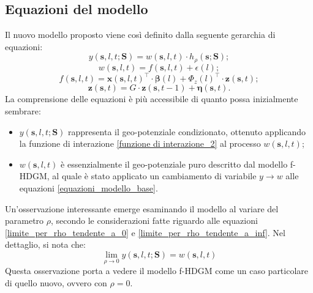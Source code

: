 \subsection[Equazioni del modello]{Equazioni del modello}
Il nuovo modello proposto viene così definito dalla seguente gerarchia di equazioni:
\begin{equation}
	y(\mathbf{s}, l, t; \mathbf{S}) = w(\mathbf{s}, l, t)\cdot h_\rho(\mathbf{s};\mathbf{S});
	\label{eq_rumore_uscita_HDGM}
\end{equation}
\begin{equation}
	w(\mathbf{s}, l, t)= f(\mathbf{s}, l, t) + \epsilon(l);
	\label{eq_rumore_uscita_fp_HDGM}
\end{equation}
\begin{equation}
	f(\mathbf{s}, l, t) = \mathbf{x}(\mathbf{s}, l, t)^\top\cdot\boldsymbol{\beta}(l) + \Phi_z(l)^\top\cdot\mathbf{z}(\mathbf{s}, t);
	\label{eq_comp_det_fp-HDGM}
\end{equation}
\begin{equation}
	\mathbf{z}(\mathbf{s}, t) = G\cdot \mathbf{z}(\mathbf{s}, t-1) + \boldsymbol{\eta}(\mathbf{s}, t).
	\label{eq_comp_lat_fp-HDGM}
\end{equation}
La comprensione delle equazioni è più accessibile di quanto possa inizialmente sembrare:
\begin{itemize}
	\item $y(\mathbf{s}, l, t; \mathbf{S})$ rappresenta il geo-potenziale condizionato, ottenuto applicando la funzione di interazione \ref{funzione di interazione_2} al processo $w(\mathbf{s}, l, t)$;
	\item $w(\mathbf{s}, l, t)$ è essenzialmente il geo-potenziale puro descritto dal modello f-HDGM, al quale è stato applicato un cambiamento di variabile $y \rightarrow w$ alle equazioni \ref{equazioni_modello_base}.
\end{itemize}
Un'osservazione interessante emerge esaminando il modello al variare del parametro $\rho$, secondo le considerazioni fatte riguardo alle equazioni \ref{limite_per_rho_tendente_a_0} e \ref{limite_per_rho_tendente_a_inf}. Nel dettaglio, si nota che:
\begin{equation}
	\lim_{\rho \to 0} y(\mathbf{s}, l, t; \mathbf{S}) = w(\mathbf{s}, l, t) \label{limite_geo-potenziale_condizionato_rho_a_0}
\end{equation}
Questa osservazione porta a vedere il modello f-HDGM come un caso particolare di quello nuovo, ovvero con $\rho=0$.

